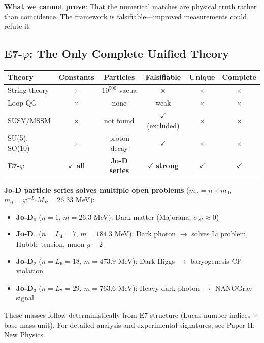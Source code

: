 \documentclass[11pt,a4paper]{article}
\begin{document}
\textbf{What we cannot prove}: That the numerical matches are physical truth rather than coincidence. The framework is falsifiable---improved measurements could refute it.

\subsection*{E7-$\varphi$: The Only Complete Unified Theory}

\begin{center}
\begin{tabular}{|l|c|c|c|c|c|}
\hline
\textbf{Theory} & \textbf{Constants} & \textbf{Particles} & \textbf{Falsifiable} & \textbf{Unique} & \textbf{Complete} \\
\hline
String theory & $\times$ & $10^{500}$ vacua & $\times$ & $\times$ & $\times$ \\
Loop QG & $\times$ & none & weak & $\times$ & $\times$ \\
SUSY/MSSM & $\times$ & not found & $\checkmark$ (excluded) & $\times$ & $\times$ \\
SU(5), SO(10) & $\times$ & proton decay & $\checkmark$ & $\times$ & $\times$ \\
\textbf{E7-$\varphi$} & $\checkmark$ \textbf{all} & \textbf{Jo-D series} & $\checkmark$ \textbf{strong} & $\checkmark$ & $\checkmark$ \\
\hline
\end{tabular}
\end{center}

\textbf{Jo-D particle series solves multiple open problems} ($m_n = n \times m_0$, $m_0 = \varphi^{-L_4} M_P = 26.33$ MeV):
\begin{itemize}
\item \textbf{Jo-D$_0$} ($n=1$, $m=26.3$ MeV): Dark matter (Majorana, $\sigma_{SI} \approx 0$)
\item \textbf{Jo-D$_1$} ($n=L_4=7$, $m=184.3$ MeV): Dark photon $\to$ solves Li problem, Hubble tension, muon $g-2$
\item \textbf{Jo-D$_2$} ($n=L_6=18$, $m=473.9$ MeV): Dark Higgs $\to$ baryogenesis CP violation
\item \textbf{Jo-D$_3$} ($n=L_7=29$, $m=763.6$ MeV): Heavy dark photon $\to$ NANOGrav signal
\end{itemize}

These masses follow deterministically from E7 structure (Lucas number indices $\times$ base mass unit). For detailed analysis and experimental signatures, see Paper II: New Physics.
\end{document}
